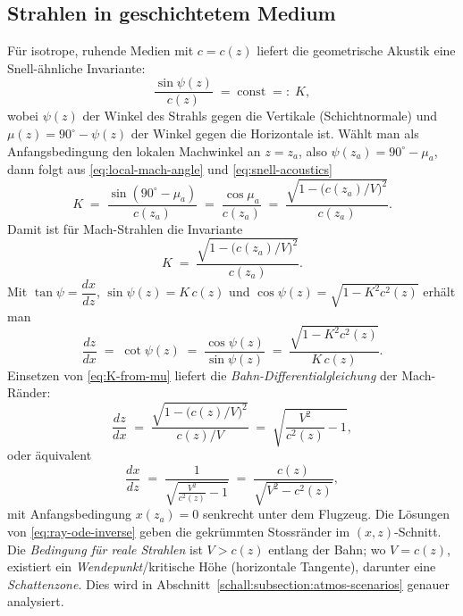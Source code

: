 \subsection{Strahlen in geschichtetem Medium}
Für isotrope, ruhende Medien mit $c=c(z)$ liefert die geometrische
Akustik eine Snell-ähnliche Invariante:
\begin{equation}
  \frac{\sin\psi(z)}{c(z)} \;=\; \text{const} \;=:\; K ,
  \label{eq:snell-acoustics}
\end{equation}
wobei $\psi(z)$ der Winkel des Strahls gegen die Vertikale
(Schichtnormale) und $\mu(z)=90^\circ-\psi(z)$ der Winkel gegen
die Horizontale ist.
Wählt man als Anfangsbedingung den lokalen Machwinkel an $z=z_a$,
also $\psi(z_a)=90^\circ-\mu_a$, dann folgt aus
\eqref{eq:local-mach-angle} und \eqref{eq:snell-acoustics}
\[
  K \;=\; \frac{\sin(90^\circ-\mu_a)}{c(z_a)} \;=\;
  \frac{\cos\mu_a}{c(z_a)} \;=\;
  \frac{\sqrt{1-\bigl(c(z_a)/V\bigr)^2}}{c(z_a)}.
\]
Damit ist für Mach-Strahlen die Invariante
\begin{equation}
  K \;=\; \frac{\sqrt{1-\bigl(c(z_a)/V\bigr)^2}}{c(z_a)}.
  \label{eq:K-from-mu}
\end{equation}
Mit $\tan\psi = \dfrac{dx}{dz}$, $\sin\psi(z) = K\,c(z)$ und
$\cos\psi(z) = \sqrt{1 - K^2 c^2(z)}$ erhält man
\begin{equation}
  \frac{dz}{dx} \;=\; \cot\psi(z) \;=\;
  \frac{\cos\psi(z)}{\sin\psi(z)} \;=\;
  \frac{\sqrt{1 - K^2 c^2(z)}}{K\,c(z)}.
\end{equation}
Einsetzen von \eqref{eq:K-from-mu} liefert die
\emph{Bahn-Differentialgleichung} der Mach-Ränder:
\[
  \frac{dz}{dx} \;=\; \frac{\sqrt{1 - \bigl(c(z)/V\bigr)^2}}{\,c(z)/V\,}
  \;=\; \sqrt{\frac{V^2}{c^2(z)} - 1},
\]
oder äquivalent
\begin{equation}
  \frac{dx}{dz} \;=\; \frac{1}{\sqrt{\frac{V^2}{c^2(z)} - 1}} \;=\;
  \frac{c(z)}{\sqrt{V^2 - c^2(z)}},
  \label{eq:ray-ode-inverse}
\end{equation}
mit Anfangsbedingung $x(z_a)=0$ senkrecht unter dem Flugzeug.
Die Lösungen von \eqref{eq:ray-ode-inverse} geben die gekrümmten Stossränder
im $(x,z)$-Schnitt. Die \emph{Bedingung für reale Strahlen} ist $V>c(z)$
entlang der Bahn; wo $V=c(z)$, existiert ein \emph{Wendepunkt}/kritische Höhe
(horizontale Tangente), darunter eine \emph{Schattenzone}.
Dies wird in Abschnitt~\ref{schall:subsection:atmos-scenarios} genauer analysiert.

